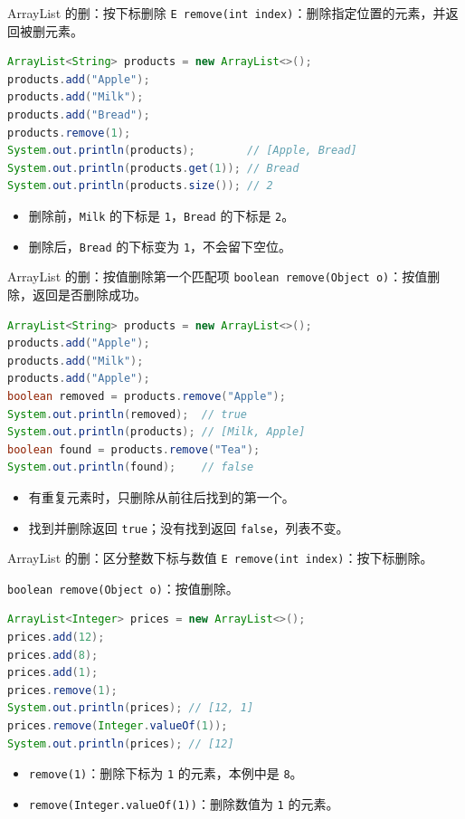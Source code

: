 \documentclass[aspectratio=169]{beamer}
\begin{document}
\begin{frame}[fragile]{ArrayList 的删：按下标删除}
  \texttt{E remove(int index)}：删除指定位置的元素，并返回被删元素。
  \begin{lstlisting}[language=Java]
ArrayList<String> products = new ArrayList<>();
products.add("Apple");
products.add("Milk");
products.add("Bread");
products.remove(1);
System.out.println(products);        // [Apple, Bread]
System.out.println(products.get(1)); // Bread
System.out.println(products.size()); // 2
  \end{lstlisting}
  \begin{itemize}
    \item 删除前，\texttt{Milk} 的下标是 \texttt{1}，\texttt{Bread} 的下标是 \texttt{2}。
    \item 删除后，\texttt{Bread} 的下标变为 \texttt{1}，不会留下空位。
  \end{itemize}
\end{frame}

\begin{frame}[fragile]{ArrayList 的删：按值删除第一个匹配项}
  \texttt{boolean remove(Object o)}：按值删除，返回是否删除成功。
  \begin{lstlisting}[language=Java]
ArrayList<String> products = new ArrayList<>();
products.add("Apple");
products.add("Milk");
products.add("Apple");
boolean removed = products.remove("Apple");
System.out.println(removed);  // true
System.out.println(products); // [Milk, Apple]
boolean found = products.remove("Tea");
System.out.println(found);    // false
  \end{lstlisting}
  \begin{itemize}
    \item 有重复元素时，只删除从前往后找到的\alert{第一个}。
    \item 找到并删除返回 \texttt{true}；没有找到返回 \texttt{false}，列表不变。
  \end{itemize}
\end{frame}

\begin{frame}[fragile]{ArrayList 的删：区分整数下标与数值}
  \texttt{E remove(int index)}：按下标删除。
  \par
  \texttt{boolean remove(Object o)}：按值删除。
  \begin{lstlisting}[language=Java]
ArrayList<Integer> prices = new ArrayList<>();
prices.add(12);
prices.add(8);
prices.add(1);
prices.remove(1);
System.out.println(prices); // [12, 1]
prices.remove(Integer.valueOf(1));
System.out.println(prices); // [12]
  \end{lstlisting}
  \begin{itemize}
    \item \texttt{remove(1)}：删除下标为 \texttt{1} 的元素，本例中是 \texttt{8}。
    \item \texttt{remove(Integer.valueOf(1))}：删除数值为 \texttt{1} 的元素。
  \end{itemize}
\end{frame}
\end{document}
